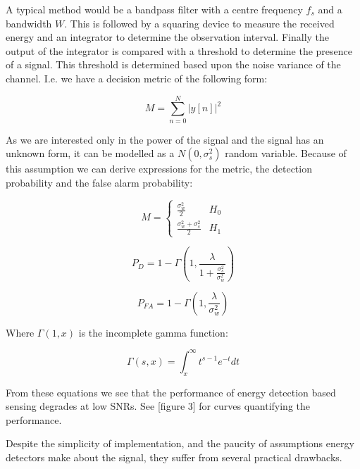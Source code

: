 A typical method would be a bandpass filter with a centre frequency \(f_{s}\) and a bandwidth \(W\). This is followed by a squaring device to measure the received energy and an integrator to determine the observation interval. Finally the output of the integrator is compared with a threshold to determine the presence of a signal. This threshold is determined based upon the noise variance of the channel. I.e. we have a decision metric of the following form:

\begin{equation}
M = \sum_{n=0}^N |y\left[n\right]|^2
\end{equation}

As we are interested only in the power of the signal and the signal has an unknown form, it can be modelled as a \(N\left(0, \sigma_s^2\right)\) random variable. Because of this assumption we can derive expressions for the metric, the detection probability and the false alarm probability:

\begin{equation}
 M =
  \begin{cases}
   \frac{\sigma_w^2}{2} & H_0 \\
   \frac{\sigma_w^2 + \sigma_s^2}{2} & H_1
  \end{cases}
\end{equation}

\begin{equation}
P_D = 1 - \Gamma\left(1, \frac{\lambda}{1 + \frac{ \sigma_s^2 }{ \sigma_w^2 } } \right)
\end{equation}

\begin{equation}
P_{FA} = 1 - \Gamma\left(1, \frac{\lambda}{\sigma_w^2} \right)
\end{equation}

Where \( \Gamma\left(1,x\right)\) is the incomplete gamma function: 

\begin{equation}
 \Gamma\left(s,x\right) = \int_x^{\infty} t^{s-1}e^{-t}dt
\end{equation}

From these equations we see that the performance of energy detection based sensing degrades at low SNRs. See \cite{Yucek2009}[figure 3] for curves quantifying the performance. 

Despite the simplicity of implementation, and the paucity of assumptions energy detectors make about the signal, they suffer from several practical drawbacks. 

